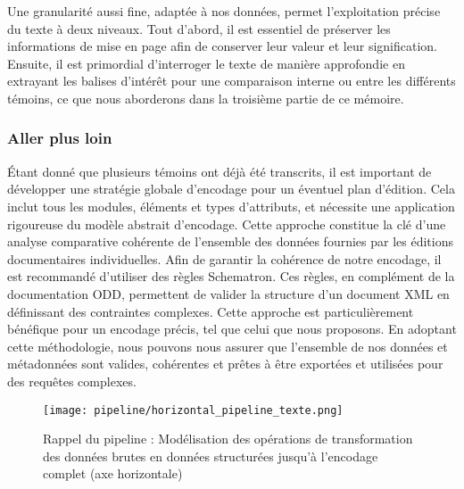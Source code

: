 \documentclass[a4paper, twoside, 12pt]{book}
\begin{document}
Une granularité aussi fine, adaptée à nos données, permet l'exploitation précise du texte à deux niveaux. Tout d'abord, il est essentiel de préserver les informations de mise en page afin de conserver leur valeur et leur signification. Ensuite, il est primordial d'interroger le texte de manière approfondie en extrayant les balises d'intérêt pour une comparaison interne ou entre les différents témoins, ce que nous aborderons dans la troisième partie de ce mémoire.\\

\subsubsection{Aller plus loin}

Étant donné que plusieurs témoins ont déjà été transcrits, il est important de développer une stratégie globale d'encodage pour un éventuel plan d'édition. Cela inclut tous les modules, éléments et types d'attributs, et nécessite une application rigoureuse du modèle abstrait d'encodage. Cette approche constitue la clé d'une analyse comparative cohérente de l'ensemble des données fournies par les éditions documentaires individuelles. Afin de garantir la cohérence de notre encodage, il est recommandé d'utiliser des règles Schematron. Ces règles, en complément de la documentation ODD, permettent de valider la structure d'un document XML en définissant des contraintes complexes. Cette approche est particulièrement bénéfique pour un encodage précis, tel que celui que nous proposons. En adoptant cette méthodologie, nous pouvons nous assurer que l'ensemble de nos données et métadonnées sont valides, cohérentes et prêtes à être exportées et utilisées pour des requêtes complexes.\\

\begin{figure}[H]
    \centering
    \texttt{[image: pipeline/horizontal\_pipeline\_texte.png]}
    \caption{ Rappel du pipeline  : Modélisation des opérations de transformation des données brutes en données structurées jusqu'à l'encodage complet (axe horizontale)}
\end{figure}
\end{document}
